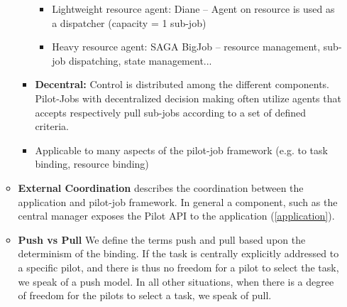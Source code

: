 \documentclass[]{article}
\begin{document}
\begin{itemize}
\begin{itemize}
\begin{itemize}
\begin{itemize}
                         \item Lightweight resource agent: Diane -- Agent on 
                         resource is used as a dispatcher (capacity = 1 sub-job)
                         \item Heavy resource agent: SAGA BigJob -- resource 
                         management, sub-job dispatching, state management...
                 \end{itemize}
				\item \textbf{Decentral:} Control is distributed among the 
				different components. Pilot-Jobs with decentralized decision 
				making often utilize agents that accepts respectively pull 
				sub-jobs according to a set of defined criteria.
				\item Applicable to many aspects of the pilot-job framework 
				(e.g. to task binding, resource binding)
			\end{itemize}		 
		 \item \textbf{External Coordination} describes the coordination between 
		 the application and pilot-job framework. In general a component, such 
		 as the central manager exposes the Pilot API to the  application 
		 (\ref{application}). 
		\item \textbf{Push vs Pull} We define the terms push and pull 
				based upon the determinism of the binding. If the task is 
				centrally explicitly addressed to a specific pilot, and there is 
				thus no freedom for a pilot to select the task, we speak of a 
				push model. In all other situations, when there is a 
            	degree of freedom for the pilots to select a task, we speak of 
            	pull.
		



\end{itemize}
\end{itemize}
\end{document}
